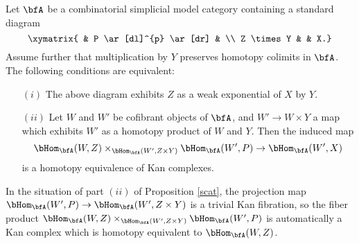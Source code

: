 \begin{Simplicial Categories}


\begin{proposition}\label{scat}
Let $\bfA$ be a combinatorial simplicial model category
containing a standard diagram
$$ \xymatrix{ & P \ar[dl]^{p} \ar[dr] & \\
Z \times Y & & X.}$$
Assume further that multiplication by $Y$ preserves homotopy colimits in $\bfA$.
The following conditions are equivalent:
\begin{itemize}
\item[$(i)$] The above diagram exhibits $Z$ as a weak exponential of 
$X$ by $Y$.

\item[$(ii)$] Let $W$ and $W'$ be cofibrant objects of $\bfA$, and
$W' \rightarrow W \times Y$ a map which exhibits $W'$ as a homotopy product
of $W$ and $Y$. Then the induced map
$$\bHom_{\bfA}(W,Z) \times_{ \bHom_{\bfA}( W', Z \times Y) } \bHom_{\bfA}(W', P)
\rightarrow \bHom_{\bfA}(W', X)$$
is a homotopy equivalence of Kan complexes.
\end{itemize}
\end{proposition}

\begin{remark}\label{kilpot}
In the situation of part $(ii)$ of Proposition \ref{scat}, the projection map
$\bHom_{\bfA}( W', P) \rightarrow \bHom_{\bfA}( W', Z \times Y)$ is a trivial Kan fibration, so
the fiber product
$\bHom_{\bfA}(W,Z) \times_{ \bHom_{\bfA}( W', Z \times Y) } \bHom_{\bfA}(W', P)$ is automatically
a Kan complex which is homotopy equivalent to $\bHom_{\bfA}(W,Z)$.
\end{remark}


\end{Simplicial Categories}
